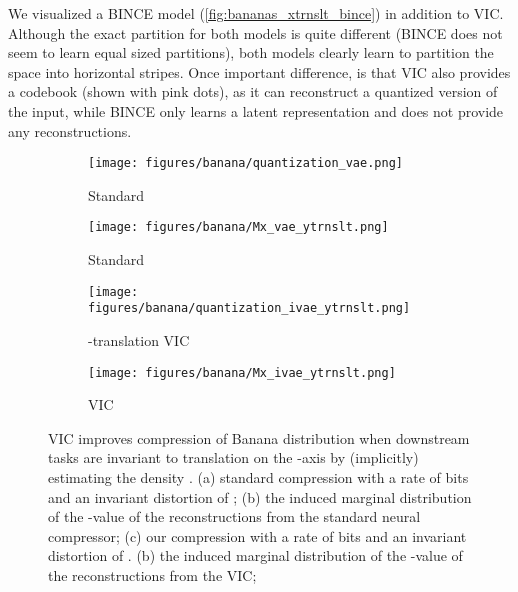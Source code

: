 \documentclass[final]{article}
\begin{document}
We visualized a BINCE model (\cref{fig:bananas_xtrnslt_bince}) in addition to VIC.
Although the exact partition for both models is quite different (BINCE does not seem to learn equal sized partitions), both models clearly learn to partition the space into horizontal stripes.
Once important difference, is that VIC also provides a codebook (shown with pink dots), as it can reconstruct a quantized version of the input, while BINCE only learns a latent representation and does not provide any reconstructions.

\begin{figure}[h]
     \centering
     \begin{subfigure}[h]{0.24\columnwidth}
         \centering
         \texttt{[image: figures/banana/quantization\_vae.png]}
         \caption{Standard}
         \label{fig:bananas_ytrnslt_vae}
     \end{subfigure}
     \hfill
     \begin{subfigure}[h]{0.24\columnwidth}
         \centering
         \texttt{[image: figures/banana/Mx\_vae\_ytrnslt.png]}
         \caption{Standard }
         \label{fig:bananas_ytrnslt_vae_Mx}
     \end{subfigure}
     \hfill
     \begin{subfigure}[h]{0.24\columnwidth}
         \centering
         \texttt{[image: figures/banana/quantization\_ivae\_ytrnslt.png]}
         \caption{-translation VIC}
         \label{fig:bananas_ytrnslt_ivae}
     \end{subfigure}
     \hfill
     \begin{subfigure}[h]{0.24\columnwidth}
         \centering
         \texttt{[image: figures/banana/Mx\_ivae\_ytrnslt.png]}
         \caption{VIC }
         \label{fig:bananas_ytrnslt_ivae_Mx}
     \end{subfigure}
\caption{
VIC improves compression of Banana distribution when downstream tasks are invariant to translation on the -axis by (implicitly) estimating the density .
(a) standard compression with a rate of  bits and an invariant distortion of  ; 
(b) the induced marginal distribution  of the -value of the reconstructions from the standard neural compressor;
(c) our compression with a rate of  bits and an invariant distortion of .
(b) the induced marginal distribution  of the -value of the reconstructions from the VIC;
}
\label{fig:bananas_ytrnslt}
\vspace{-0.5em}
\end{figure} 
\end{document}
